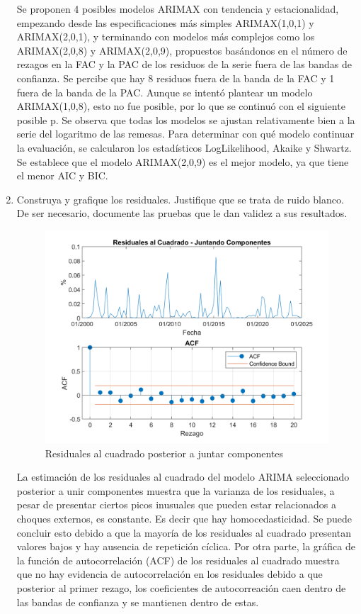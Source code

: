 \documentclass{article}
\theoremstyle{remark}
\theoremstyle{definition}
\begin{document}
\begin{enumerate}[label=\emph{\alph*})]
Se proponen 4 posibles modelos ARIMAX con tendencia y estacionalidad, empezando desde las especificaciones más simples ARIMAX(1,0,1) y ARIMAX(2,0,1), y terminando con modelos más complejos como los ARIMAX(2,0,8) y ARIMAX(2,0,9), propuestos basándonos en el número de rezagos en la FAC y la PAC de los residuos de la serie fuera de las bandas de confianza. Se percibe que hay 8 residuos fuera de la banda de la FAC y 1 fuera de la banda de la PAC. Aunque se intentó plantear un modelo ARIMAX(1,0,8), esto no fue posible, por lo que se continuó con el siguiente posible p. Se observa que todas los modelos se ajustan relativamente bien a la serie del logaritmo de las remesas. Para determinar con qué modelo continuar la evaluación, se calcularon los estadísticos LogLikelihood, Akaike y Shwartz. Se establece que el modelo ARIMAX(2,0,9) es el mejor modelo, ya que tiene el menor AIC y BIC. 
 
        
    \item {Construya y grafique los residuales. Justifique que se trata de ruido blanco. De ser necesario, documente las pruebas que le dan validez a sus resultados.}
        \begin{tcolorbox}[title=Soluci\'on 3.f]
            \begin{figure}[H]
                \centering
                \includegraphics[width=0.5\linewidth]{docs/ARIMA_2_0_9_residuales.png}
                \caption{Residuales al cuadrado posterior a juntar componentes}
                \label{fig:enter-label}
            \end{figure}
            La estimación de los residuales al cuadrado del modelo ARIMA seleccionado posterior a unir componentes muestra que la varianza de los residuales, a pesar de presentar ciertos picos inusuales que pueden estar relacionados a choques externos, es constante. Es decir que hay homocedasticidad. Se puede concluir esto debido a que la mayoría de los residuales al cuadrado presentan valores bajos y hay ausencia de repetición cíclica. Por otra parte, la gráfica de la función de autocorrelación (ACF) de los residuales al cuadrado muestra que no hay evidencia de autocorrelación en los residuales debido a que posterior al primer rezago, los coeficientes de autocorreación caen dentro de las bandas de confianza y se mantienen dentro de estas. 
            

\end{tcolorbox}
\end{enumerate}
\end{document}
